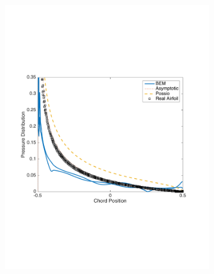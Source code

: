 \documentclass{article}
\begin{document}
\begin{figure}[h]
\centering
\begin{subfigure}{0.3\textwidth}
	\centering
	\includegraphics[width = \textwidth, height=0.16\textheight]{NACA1101_pressure_k10mag}
\end{subfigure}%
\begin{subfigure}{0.3\textwidth}
	\centering

\end{subfigure}
\end{figure}
\end{document}
